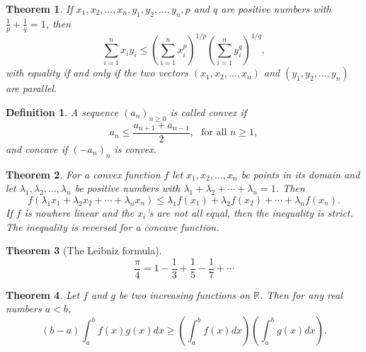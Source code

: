 \documentclass[answers, a4paper, 12pt]{exam}
\newtheorem{theorem}{Theorem}[section]
\newtheorem{definition}{Definition}
\newcommand{\R}{\mathbb{R}}
\begin{document}
\begin{theorem}
    If $x_1,x_2,\ldots,x_n, y_1,y_2,\ldots,y_n,p$ and $q$ are positive numbers with $\frac{1}{p}+\frac{1}{q}=1$, then
    $$\sum_{i=1}^{n}{x_iy_i}\leq\left(\sum_{i=1}^{n}{x_i^p}\right)^{1/p}\left(\sum_{i=1}^{n}{y_i^q}\right)^{1/q},$$
    with equality if and only if the two vectors $(x_1,x_2,\ldots,x_n)$ and $(y_1,y_2,\ldots,y_n)$ are parallel.
\end{theorem}

\begin{definition}
    A sequence $(a_n)_{n\geq 0}$ is called convex if $$a_n\leq \frac{a_{n+1}+a_{n-1}}{2},\,\,\,\,\text{for all } n\geq 1,$$ and concave if $(-a_n)_n$ is convex.
\end{definition}

\begin{theorem}
    For a convex function $f$ let $x_1,x_2,\ldots,x_n$ be points in its domain and let $\lambda_1,\lambda_2,\ldots,\lambda_n$ be positive numbers with $\lambda_1+\lambda_2+\cdots+\lambda_n=1$. Then
    $$f(\lambda_1x_1+\lambda_2x_2+\cdots+\lambda_nx_n)\leq\lambda_1f(x_1)+\lambda_2f(x_2)+\cdots+\lambda_nf(x_n).$$
    If $f$ is nowhere linear and the $x_i$'s are not all equal, then the inequality is strict. The inequality is reversed for a concave function.
\end{theorem}

\begin{theorem}[The Leibniz formula]
    $$\frac{\pi}{4}=1-\frac{1}{3}+\frac{1}{5}-\frac{1}{7}+\cdots$$
\end{theorem}

\begin{theorem}
    Let $f$ and $g$ be two increasing functions on $\R$. Then for any real numbers $a<b$,
    $$(b-a)\int_{a}^{b}{f(x)g(x)dx}\geq\left(\int_{a}^{b}{f(x)dx}\right)\left(\int_{a}^{b}{g(x)dx}\right).$$
\end{theorem}
\end{document}
